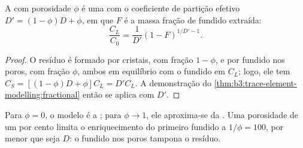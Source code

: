\begin{proposition}\label{prop:b3:trace-element-modelling:dynamic}
A  com porosidade $\phi$ é uma  com o coeficiente de partição efetivo
$D' = (1 - \phi)D + \phi$, em que $F$ é a massa
fração de fundido extraída:
\[
\frac{C_L}{C_0} = \frac{1}{D'}(1 - F)^{1/D' - 1}.
\]
\end{proposition}

\begin{proof}
O resíduo é formado por cristais, com fração $1 - \phi$, e por fundido nos poros, com
fração $\phi$, ambos em equilíbrio com o fundido em $C_L$; logo, ele tem
$C_S = [(1 - \phi)D + \phi]C_L = D'C_L$. A demonstração do
\cref{thm:b3:trace-element-modelling:fractional} então se aplica com $D'$.
\end{proof}

Para $\phi = 0$, o modelo é a ; para $\phi \to 1$, ele
aproxima-se da . Uma porosidade de um por cento limita o enriquecimento do
primeiro fundido a $1/\phi = 100$, por menor que seja $D$: o fundido nos poros
tampona o resíduo.

